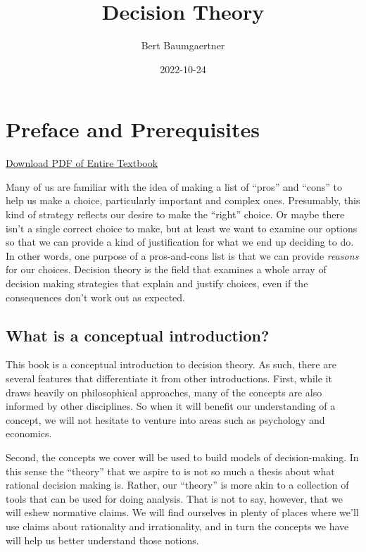 \documentclass[]{tufte-book}
\title{Decision Theory}
\author{Bert Baumgaertner}
\date{2022-10-24}
\begin{document}
\maketitle



{
\setcounter{tocdepth}{0}
\tableofcontents
}

\hypertarget{preface-and-prerequisites}{%
\chapter*{Preface and Prerequisites}\label{preface-and-prerequisites}}

\href{decisiontheory.pdf}{Download PDF of Entire Textbook}

Many of us are familiar with the idea of making a list of ``pros'' and ``cons'' to help us make a choice, particularly important and complex ones. Presumably, this kind of strategy reflects our desire to make the ``right'' choice. Or maybe there isn't a single correct choice to make, but at least we want to examine our options so that we can provide a kind of justification for what we end up deciding to do. In other words, one purpose of a pros-and-cons list is that we can provide \emph{reasons} for our choices. Decision theory is the field that examines a whole array of decision making strategies that explain and justify choices, even if the consequences don't work out as expected.

\hypertarget{what-is-a-conceptual-introduction}{%
\section{What is a conceptual introduction?}\label{what-is-a-conceptual-introduction}}

This book is a conceptual introduction to decision theory. As such, there are several features that differentiate it from other introductions. First, while it draws heavily on philosophical approaches, many of the concepts are also informed by other disciplines. So when it will benefit our understanding of a concept, we will not hesitate to venture into areas such as psychology and economics.

Second, the concepts we cover will be used to build models of decision-making. In this sense the ``theory'' that we aspire to is not so much a thesis about what rational decision making is. Rather, our ``theory'' is more akin to a collection of tools that can be used for doing analysis. That is not to say, however, that we will eshew normative claims. We will find ourselves in plenty of places where we'll use claims about rationality and irrationality, and in turn the concepts we have will help us better understand those notions.
\end{document}

